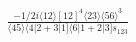 \documentclass[varwidth, border=5pt]{standalone}
\begin{document}
\begin{my}
$\begin{gathered}
\scriptscriptstyle\frac{-1/2i\langle12\rangle[12]^4\langle23\rangle\langle56\rangle^3}{\langle45\rangle\langle4|2+3|1]\langle6|1+2|3]s_{123}}
\end{gathered}$
\end{my}
\end{document}
